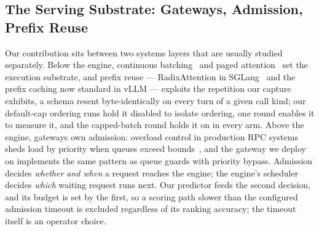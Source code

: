 \subsection{The Serving Substrate: Gateways, Admission, Prefix Reuse}
Our contribution sits between two systems layers that are usually studied
separately. Below the engine, continuous
batching~\cite{orca2022} and paged attention~\cite{vllm2023} set the
execution substrate, and prefix reuse --- RadixAttention in
SGLang~\cite{sglang2024} and the prefix caching now standard in
vLLM --- exploits the repetition our capture exhibits, a
schema resent byte-identically on every turn of a given call kind; our
default-cap ordering runs hold it
disabled to isolate ordering, one round enables it to measure it, and the
capped-batch round holds it on in every arm. Above the engine, gateways
own admission: overload control in production RPC systems sheds load
by priority when queues exceed bounds~\cite{dagor2018}, and the
gateway we deploy on implements the same pattern as queue guards with
priority bypass. Admission decides \emph{whether and when} a request
reaches the engine; the engine's scheduler decides \emph{which}
waiting request runs next. Our predictor feeds the second decision,
and its budget is set by the first, so a scoring path
slower than the configured admission timeout is excluded regardless of
its ranking accuracy; the timeout itself is an operator choice.

